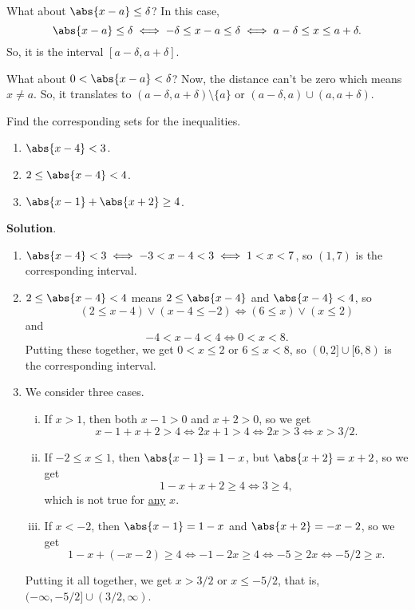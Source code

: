 What about $ \abs{x-a}\le \delta $? In this case,
\[ \abs{x-a}\le \delta\iff -\delta\le x-a\le \delta\iff a-\delta\le x\le a+\delta. \]
So, it is the interval $ [a-\delta,a+\delta] $.

What about $ 0<\abs{x-a}<\delta $? Now, the distance can't be zero which means $ x\ne a $. So,
it translates to $ (a-\delta,a+\delta)\setminus\{a\} $ or $ (a-\delta,a)\cup (a,a+\delta) $.

\begin{Example}{}{}
    Find the corresponding sets for the inequalities.
    \begin{enumerate}[(1)]
        \item $ \abs{x-4}<3 $.
        \item $ 2\le \abs{x-4}<4 $.
        \item $ \abs{x-1}+\abs{x+2}\ge 4 $.
    \end{enumerate}
    \tcblower{}
    \textbf{Solution}.
    \begin{enumerate}[(1)]
        \item $ \abs{x-4}<3\iff -3<x-4<3\iff 1<x<7 $, so $ (1,7) $ is the corresponding interval.
        \item $ 2\le \abs{x-4}<4 $ means $ 2\le \abs{x-4} $ and $ \abs{x-4}<4 $, so
              \[ (2\le x-4)\lor (x-4\le -2)\iff (6\le x)\lor (x\le 2) \]
              and
              \[ -4<x-4<4\iff 0<x<8. \]
              Putting these together, we get $ 0<x\le 2 $ or $ 6\le x<8 $, so $ (0,2]\cup [6,8) $ is the corresponding interval.
        \item We consider three cases.
              \begin{enumerate}[(i)]
                  \item If $ x> 1 $, then both $ x-1> 0 $ and $ x+2> 0 $, so we get
                        \[ x-1+x+2> 4\iff 2x+1> 4\iff 2x> 3\iff x>3/2. \]
                  \item If $ -2\le x\le 1 $, then $ \abs{x-1}=1-x $, but $ \abs{x+2}=x+2 $, so we get
                        \[ 1-x+x+2\ge 4\iff 3\ge 4, \] which is not true for \underline{any} $ x $.
                  \item If $ x<-2 $, then $ \abs{x-1}=1-x $ and $ \abs{x+2}=-x-2 $, so we get
                        \[ 1-x+(-x-2)\ge 4\iff -1-2x\ge 4\iff -5\ge 2x\iff -5/2\ge x. \]
              \end{enumerate}
              Putting it all together, we get $ x>3/2 $ or $ x\le -5/2 $, that is,
              $ (-\infty,-5/2]\cup (3/2,\infty) $.
    \end{enumerate}
\end{Example}